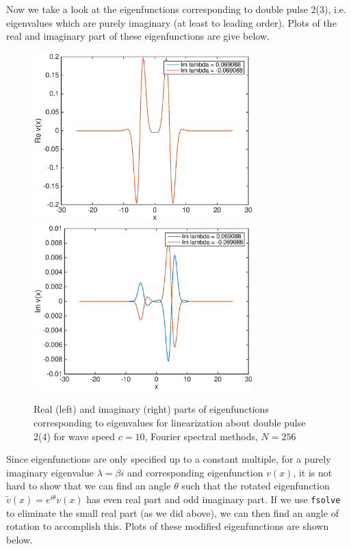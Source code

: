 \documentclass[12pt]{article}
\begin{document}
Now we take a look at the eigenfunctions corresponding to double pulse 2(3), i.e. eigenvalues which are purely imaginary (at least to leading order). Plots of the real and imaginary part of these eigenfunctions are give below.

\begin{figure}[H]
	\includegraphics[width=8.5cm]{four10dp2eigenfnsreal}
	\includegraphics[width=8.5cm]{four10dp2eigenfnsimag}
	\caption{Real (left) and imaginary (right) parts of eigenfunctions corresponding to eigenvalues for linearization about double pulse 2(4) for wave speed $c = 10$, Fourier spectral methods, $N = 256$}
\end{figure}

Since eigenfunctions are only specified up to a constant multiple, for a purely imaginary eigenvalue $\lambda = \beta i$ and corresponding eigenfunction $v(x)$, it is not hard to show that we can find an angle $\theta$ such that the rotated eigenfunction $\tilde{v}(x) = e^{i \theta} v(x)$ has even real part and odd imaginary part. If we use \texttt{fsolve} to eliminate the small real part (as we did above), we can then find an angle of rotation to accomplish this. Plots of these modified eigenfunctions are shown below.
\end{document}
